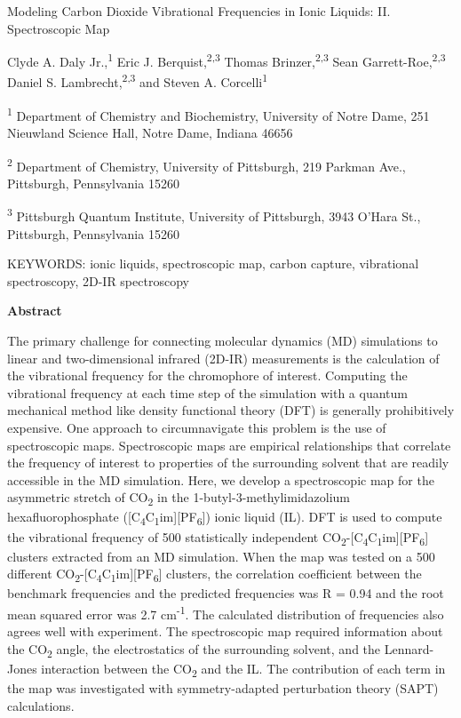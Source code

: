 \documentclass[]{article}
\date{}
\begin{document}
Modeling Carbon Dioxide Vibrational Frequencies in Ionic Liquids: II. Spectroscopic Map

Clyde A. Daly Jr.,\textsuperscript{1} Eric J.  Berquist,\textsuperscript{2,3} Thomas Brinzer,\textsuperscript{2,3} Sean Garrett-Roe,\textsuperscript{2,3} Daniel S.  Lambrecht,\textsuperscript{2,3} and Steven A.  Corcelli\textsuperscript{1}

\textsuperscript{1} Department of Chemistry and Biochemistry, University of Notre Dame, 251 Nieuwland Science Hall, Notre Dame, Indiana 46656

\textsuperscript{2} Department of Chemistry, University of Pittsburgh, 219 Parkman Ave., Pittsburgh, Pennsylvania 15260

\textsuperscript{3} Pittsburgh Quantum Institute, University of Pittsburgh, 3943 O'Hara St., Pittsburgh, Pennsylvania 15260

KEYWORDS: ionic liquids, spectroscopic map, carbon capture, vibrational spectroscopy, 2D-IR spectroscopy

\textbf{Abstract}

The primary challenge for connecting molecular dynamics (MD) simulations to linear and two-dimensional infrared (2D-IR) measurements is the calculation of the vibrational frequency for the chromophore of interest. Computing the vibrational frequency at each time step of the simulation with a quantum mechanical method like density functional theory (DFT) is generally prohibitively expensive. One approach to circumnavigate this problem is the use of spectroscopic maps.  Spectroscopic maps are empirical relationships that correlate the frequency of interest to properties of the surrounding solvent that are readily accessible in the MD simulation. Here, we develop a spectroscopic map for the asymmetric stretch of CO\textsubscript{2} in the 1-butyl-3-methylimidazolium hexafluorophosphate ({[}C\textsubscript{4}C\textsubscript{1}im{]}{[}PF\textsubscript{6}{]}) ionic liquid (IL). DFT is used to compute the vibrational frequency of 500 statistically independent CO\textsubscript{2}-{[}C\textsubscript{4}C\textsubscript{1}im{]}{[}PF\textsubscript{6}{]} clusters extracted from an MD simulation. When the map was tested on a 500 different CO\textsubscript{2}-{[}C\textsubscript{4}C\textsubscript{1}im{]}{[}PF\textsubscript{6}{]} clusters, the correlation coefficient between the benchmark frequencies and the predicted frequencies was R = 0.94 and the root mean squared error was 2.7 cm\textsuperscript{-1}. The calculated distribution of frequencies also agrees well with experiment. The spectroscopic map required information about the CO\textsubscript{2} angle, the electrostatics of the surrounding solvent, and the Lennard-Jones interaction between the CO\textsubscript{2} and the IL. The contribution of each term in the map was investigated with symmetry-adapted perturbation theory (SAPT) calculations.
\end{document}
